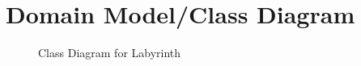 \documentclass{FastFyp}
\begin{document}
\section{Domain Model/Class Diagram}
\begin{figure} [!h]
    \centering
    
    
    \caption{Class Diagram for Labyrinth}
    \label{fig:1}
\end{figure}
\FloatBarrier
\end{document}
